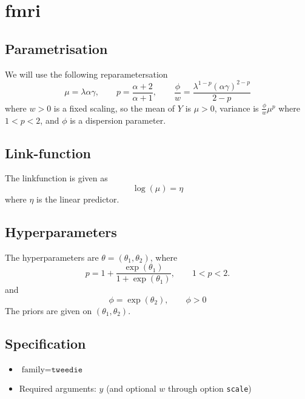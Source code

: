 \documentclass[a4paper,11pt]{article}
\begin{document}
\section*{fmri}

\subsection*{Parametrisation}


We will use the following reparametersation
\begin{displaymath}
    \mu = \lambda \alpha \gamma,\qquad
    p = \frac{\alpha+2}{\alpha+1},\qquad
    \frac{\phi}{w} = \frac{\lambda^{1-p} (\alpha\gamma)^{2-p}}{2-p}
\end{displaymath}
where $w>0$ is a fixed scaling, so the mean of $Y$ is $\mu>0$,
variance is $\frac{\phi}{w} \mu^{p}$ where $1<p<2$, and $\phi$ is a
dispersion parameter.

\subsection*{Link-function}

The linkfunction is given as 
\begin{displaymath}
    \log(\mu) =  \eta
\end{displaymath}
where $\eta$  is the linear predictor.

\subsection*{Hyperparameters}

The hyperparameters are ${\theta}=(\theta_1,\theta_2)$, where
\begin{displaymath}
    p=1 + \frac{\exp(\theta_1)}{1+\exp(\theta_1)}, \qquad 1<p<2.
\end{displaymath}
and
\begin{displaymath}
    \phi=\exp(\theta_2), \qquad \phi>0
\end{displaymath}
The priors are given on $(\theta_1,\theta_2)$.
\subsection*{Specification}

\begin{itemize}
\item $\text{family}=\texttt{tweedie}$
\item Required arguments: $y$ (and optional $w$ through option
    \texttt{scale})
\end{itemize}
\end{document}
